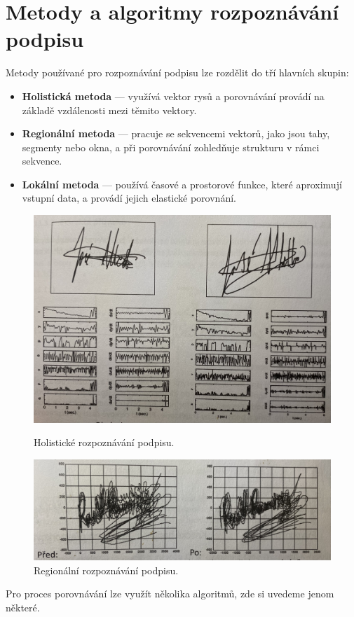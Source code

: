 \section{Metody a algoritmy rozpoznávání podpisu}
Metody používané pro rozpoznávání podpisu lze rozdělit do tří hlavních skupin:
\begin{itemize}
  \item \textbf{Holistická metoda} --- využívá vektor rysů a porovnávání provádí na základě vzdálenosti mezi těmito vektory.
  \item \textbf{Regionální metoda} --- pracuje se sekvencemi vektorů, jako jsou tahy, segmenty nebo okna, a při porovnávání zohledňuje strukturu v rámci sekvence.
  \item \textbf{Lokální metoda} --- používá časové a prostorové funkce, které aproximují vstupní data, a provádí jejich elastické porovnání.~\cite{DrahanskýMartin2011}
\end{itemize}

\begin{figure}[H]
  \centering
  \begin{minipage}{1\textwidth}
      \centering
      \includegraphics[width=\textwidth]{obrazky-figures/holisticke.jpg}
      \caption{Holistické rozpoznávání podpisu.~\cite{DrahanskýMartin2011}}
      \label{fig:holisticke_rozpoznavani}
  \end{minipage}\hfill
  \begin{minipage}{1\textwidth}
      \centering
      \includegraphics[width=\textwidth]{obrazky-figures/regionalni.jpg}
      \caption{Regionální rozpoznávání podpisu.~\cite{DrahanskýMartin2011}}
      \label{fig:geometricka_normalizace}
  \end{minipage}
\end{figure}
\noindent
Pro proces porovnávání lze využít několika algoritmů, zde si uvedeme jenom některé.
\newline

